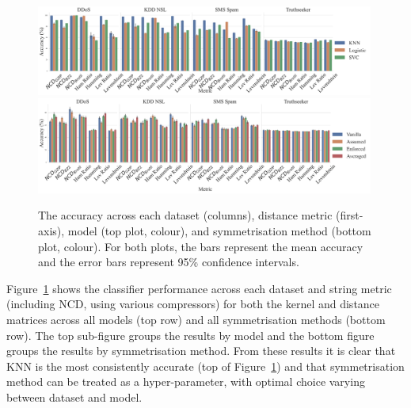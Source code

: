 \documentclass[preprint,12pt]{article}
\begin{document}
\begin{figure}[!htb]
    \centering
    \includegraphics[width=0.99\textwidth]{images/accuracy_vs_metric.pdf}
    \hfill
    \includegraphics[width=0.99\textwidth]{images/accuracy_vs_symmetry.pdf}
    \caption{
    The accuracy across each dataset (columns), distance metric (first-axis),  model (top plot, colour), and symmetrisation method (bottom plot, colour).
    For both plots, the bars represent the mean accuracy and the error bars represent 95\% confidence intervals.
    }
    \label{fig:acc}
\end{figure}

Figure~\ref{fig:acc} shows the classifier performance across each dataset and string metric (including NCD, using various compressors) for both the kernel and distance matrices across all models (top row) and all symmetrisation methods (bottom row). 
The top sub-figure groups the results by model and the bottom figure groups the results by symmetrisation method.
From these results it is clear that KNN is the most consistently accurate (top of Figure~\ref{fig:acc}) and that symmetrisation method can be treated as a hyper-parameter, with optimal choice varying between dataset and model.
\end{document}
